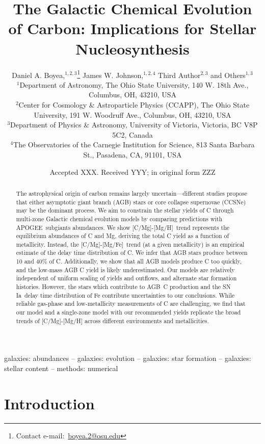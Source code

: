 \documentclass[fleqn,
referee, %
usenatbib]{mnras}
\title[The Origin and Galactic Evolution of Carbon]{The Galactic Chemical Evolution of Carbon: Implications for Stellar Nucleosynthesis }
\author[D. A. Boyea et. al.]{%
Daniel A. Boyea,$^{1, 2, 3}$\thanks{%
Contact e-mail:~\href{mailto:boyea.2@osu.edu}{boyea.2@osu.edu}}
James W. Johnson,$^{1, 2, 4}$
Third Author$^{2,3}$
and Others$^{1,3}$
\\
$^{1}$Department of Astronomy, The Ohio State University, 140 W. 18th Ave., Columbus, OH, 43210, USA
\\
$^{2}$Center for Cosmology \& Astroparticle Physics (CCAPP), The Ohio State University, 191 W. Woodruff Ave., Columbus, OH, 43210, USA
\\
$^{3}$Department of Physics \& Astronomy, University of Victoria, Victoria, BC V8P 5C2, Canada
\\
$^{4}$The Observatories of the Carnegie Institution for Science, 813 Santa Barbara St., Pasadena, CA, 91101, USA
}
\date{Accepted XXX. Received YYY; in original form ZZZ}
\newcommand{\agb}{AGB}
\newcommand{\apogee}{APOGEE}
\newcommand{\ia}{SN Ia}
\newcommand{\caah}{[C/Mg]-[Mg/H]}
\newcommand{\caafe}{[C/Mg]-[Mg/Fe]}
\begin{document}
\label{firstpage}
\pagerange{\pageref{firstpage}--\pageref{lastpage}}
\maketitle



\begin{abstract}
The astrophysical origin of carbon remains largely uncertain---different studies propose that either asymptotic giant branch (AGB) stars or core collapse supernovae (CCSNe) may be the dominant process.
% 
We aim to constrain the stellar yields of C through multi-zone Galactic chemical evolution models by comparing predictions with \apogee\ subgiants abundances.
% 
We show \caah\ trend represents the equilibrium abundances of C and Mg, deriving the total C yield as a function of metallicity. 
Instead, the \caafe\ trend (at a given metallicity) is an empirical estimate of the delay time distribution of C.
We infer that AGB stars produce between 10 and 40\% of C. Additionally, we show that all AGB models produce C too quickly, and the low-mass AGB C yield is likely underestimated. 
Our models are relatively independent of uniform scaling of yields and outflows, and alternate star formation histories. 
However, the stars which contribute to \agb\ C production and the \ia\ delay time distribution of Fe contribute uncertainties to our conclusions. 
While reliable gas-phase and low-metallicity measurements of C are challenging, we find that our model and a single-zone model with our recommended yields replicate the broad trends of \caah{} across different environments and metallicities. 

\end{abstract}

\begin{keywords}
galaxies: abundances -- galaxies: evolution -- galaxies: star formation -- galaxies: stellar content -- methods: numerical
\end{keywords}





\section{Introduction}
\end{document}
